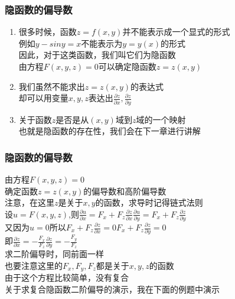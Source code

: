 \documentclass[xetex]{beamer}
\begin{document}
\begin{frame}
\frametitle{隐函数的偏导数}
	\begin{enumerate}
		\item 	很多时候，函数$z=f(x,y)$并不能表示成一个显式的形式\\
		例如$y-siny=x$不能表示为$y=y(x)$的形式\\
		因此，对于这类函数，我们叫它们为隐函数\\
		由方程$F(x,y,z)=0$可以确定隐函数$z=z(x,y)$\\ \pause
		\item   我们虽然不能求出$z=z(x,y)$的表达式\\
		却可以用变量$x,y,z$表达出$\frac{\partial z}{\partial x},\frac{\partial z}{\partial y}$\\ \pause
		\item   关于函数$z$是否是从$(x,y)$域到$z$域的一个映射\\
		也就是隐函数的存在性，我们会在下一章进行讲解\\
	\end{enumerate}
\end{frame}

\begin{frame}
\frametitle{隐函数的偏导数}
	由方程$F(x,y,z)=0$\\
	确定函数$z=z(x,y)$的偏导数和高阶偏导数\\ 
	注意，在这里$z$是关于$x,y$的函数，求导时记得链式法则\\ \pause
	设$u=F(x,y,z)$,则$\frac{\partial u}{\partial x}=F_x+F_z\frac{\partial z}{\partial x}$\quad $\frac{\partial u}{\partial y}=F_x+F_z\frac{\partial z}{\partial y}$\\ \pause
	又因为$u=0$\quad 所以$F_x+F_z\frac{\partial z}{\partial x}=0$\quad $F_x+F_z\frac{\partial z}{\partial y}=0$\\ \pause
	即$\frac{\partial z}{\partial x}=-\frac{F_x}{F_z}$\quad$\frac{\partial z}{\partial y}=-\frac{F_y}{F_z}$\\ \pause
	求二阶偏导时，同前面一样\\
	也要注意这里的$F_x,F_y,F_z$都是关于$x,y,z$的函数\\
	由于这个方程比较简单，没有复合\\
	关于求复合隐函数二阶偏导的演示，我在下面的例题中演示\\
\end{frame}
\end{document}
